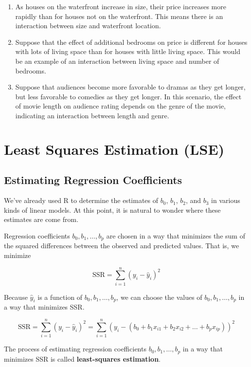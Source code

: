 \documentclass[
  letterpaper,
  DIV=11,
  numbers=noendperiod]{scrreprt}
\begin{document}
\begin{enumerate}
\def\labelenumi{\arabic{enumi}.}
\item
  As houses on the waterfront increase in size, their price increases
  more rapidly than for houses not on the waterfront. This means there
  is an interaction between size and waterfront location.
\item
  Suppose that the effect of additional bedrooms on price is different
  for houses with lots of living space than for houses with little
  living space. This would be an example of an interaction between
  living space and number of bedrooms.
\item
  Suppose that audiences become more favorable to dramas as they get
  longer, but less favorable to comedies as they get longer. In this
  scenario, the effect of movie length on audience rating depends on the
  genre of the movie, indicating an interaction between length and
  genre.
\end{enumerate}

\section{Least Squares Estimation
(LSE)}\label{least-squares-estimation-lse}

\subsection{Estimating Regression
Coefficients}\label{estimating-regression-coefficients}

We've already used R to determine the estimates of \(b_0\), \(b_1\),
\(b_2\), and \(b_3\) in various kinds of linear models. At this point,
it is natural to wonder where these estimates are come from.

Regression coefficients \(b_0, b_1, \ldots, b_p\) are chosen in a way
that minimizes the sum of the squared differences between the observed
and predicted values. That is, we minimize

\[
\text{SSR} = \displaystyle\sum_{i=1}^{n} (y_i-\hat{y}_i)^2
\]

Because \(\hat{y}_i\) is a function of \(b_0, b_1, \ldots, b_p\), we can
choose the values of \(b_0, b_1, \ldots, b_p\) in a way that minimizes
SSR.

\[\text{SSR} = \displaystyle\sum_{i=1}^n (y_i -\hat{y}_i)^2  = \displaystyle\sum_{i=1}^n (y_i -(b_0 + b_1x_{i1} + b_2x_{i2} + \ldots + b_px_{ip}))^2 \]

The process of estimating regression coefficients
\(b_0, b_1, \ldots, b_p\) in a way that minimizes SSR is called
\textbf{least-squares estimation}.
\end{document}
